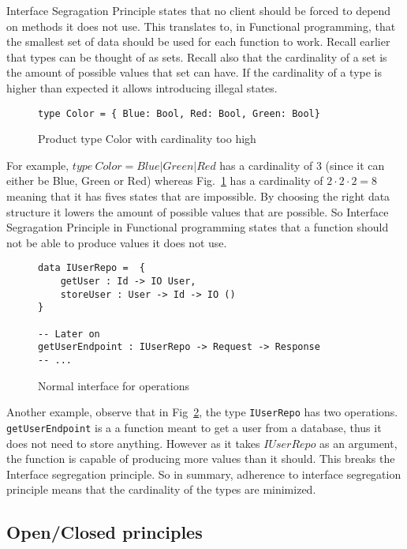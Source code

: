 Interface Segragation Principle states that no client should be forced to depend
on methods it does not use. This translates to, in Functional programming, that
the smallest set of data should be used for each function to work. Recall
earlier that types can be thought of as sets. Recall also that the cardinality
of a set is the amount of possible values that set can have. If the cardinality
of a type is higher than expected it allows introducing illegal states. 

\begin{figure}[H]
    \begin{lstlisting}
type Color = { Blue: Bool, Red: Bool, Green: Bool}
    \end{lstlisting}
    \caption{Product type Color with cardinality too high}
    \label{colorcardinality}
\end{figure}


For example, $type\ Color = Blue | Green | Red$ has a cardinality of 3 (since it
can either be Blue, Green or Red) whereas Fig.~\ref{colorcardinality} has a
cardinality of $2\cdot 2\cdot 2 = 8$ meaning that it has fives states that are
impossible. By choosing the right data structure it lowers the amount of
possible values that are possible. So Interface Segragation Principle in
Functional programming states that a function should not be able to produce
values it does not use.

\begin{figure}[H]
    \begin{lstlisting}
data IUserRepo =  {
	getUser : Id -> IO User,
	storeUser : User -> Id -> IO ()
}

-- Later on
getUserEndpoint : IUserRepo -> Request -> Response
-- ...
    \end{lstlisting}
    \caption{Normal interface for operations}
    \label{twomanyoperations}
\end{figure}


Another example, observe that in Fig~\ref{twomanyoperations}, the type
\texttt{IUserRepo} has two operations. \texttt{getUserEndpoint} is a a function
meant to get a user from a database, thus it does not need to store anything.
However as it takes $IUserRepo$ as an argument, the function is capable of
producing more values than it should. This breaks the Interface segregation
principle. So in summary, adherence to interface segregation principle means
that the cardinality of the types are minimized.

\subsection{Open/Closed principles}\label{openclosed}

